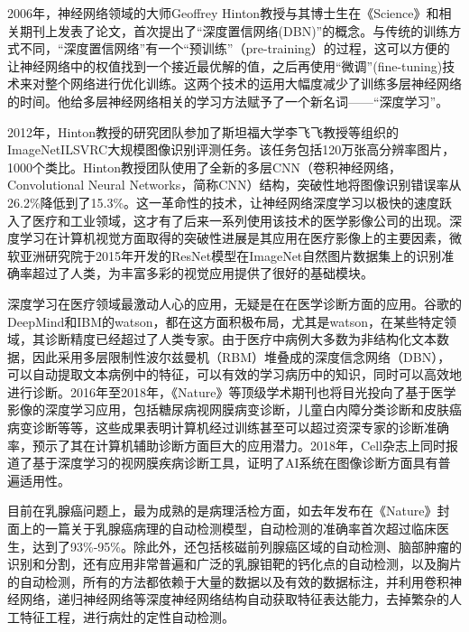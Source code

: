 2006年，神经网络领域的大师Geoffrey Hinton教授与其博士生在《Science》和相关期刊上发表了论文，首次提出了“深度置信网络(DBN)\cite{6hinton2006fast}”的概念。与传统的训练方式不同，“深度置信网络”有一个“预训练”（pre-training）的过程，这可以方便的让神经网络中的权值找到一个接近最优解的值，之后再使用“微调”(fine-tuning)技术来对整个网络进行优化训练。这两个技术的运用大幅度减少了训练多层神经网络的时间。他给多层神经网络相关的学习方法赋予了一个新名词——“深度学习”。

2012年，Hinton教授的研究团队参加了斯坦福大学李飞飞教授等组织的ImageNetILSVRC大规模图像识别评测任务\cite{7krizhevsky2012imagenet}。该任务包括120万张高分辨率图片，1000个类比。Hinton教授团队使用了全新的多层CNN（卷积神经网络，Convolutional Neural Networks，简称CNN）结构，突破性地将图像识别错误率从26.2\%降低到了15.3\%。这一革命性的技术，让神经网络深度学习以极快的速度跃入了医疗和工业领域，这才有了后来一系列使用该技术的医学影像公司的出现。深度学习在计算机视觉方面取得的突破性进展是其应用在医疗影像上的主要因素，微软亚洲研究院于2015年开发的ResNet\cite{8he2016deep}模型在ImageNet自然图片数据集上的识别准确率超过了人类，为丰富多彩的视觉应用提供了很好的基础模块。

深度学习在医疗领域最激动人心的应用，无疑是在在医学诊断方面的应用。谷歌的DeepMind和IBM的watson，都在这方面积极布局，尤其是watson，在某些特定领域，其诊断精度已经超过了人类专家。由于医疗中病例大多数为非结构化文本数据，因此采用多层限制性波尔兹曼机（RBM）\cite{9nair2010rectified}堆叠成的深度信念网络（DBN），可以自动提取文本病例中的特征，可以有效的学习病历中的知识，同时可以高效地进行诊断。2016年至2018年，《Nature》等顶级学术期刊也将目光投向了基于医学影像的深度学习应用，包括糖尿病视网膜病变诊断\cite{10morris2017technology}，儿童白内障分类诊断\cite{11long2017artificial}和皮肤癌病变诊断\cite{12esteva2017dermatologist}等等，这些成果表明计算机经过训练甚至可以超过资深专家的诊断准确率，预示了其在计算机辅助诊断方面巨大的应用潜力。2018年，Cell杂志上同时报道了基于深度学习的视网膜疾病诊断工具\cite{13kermany2018identifying}，证明了AI系统在图像诊断方面具有普遍适用性。

目前在乳腺癌问题上，最为成熟的是病理活检方面，如去年发布在《Nature》封面上的一篇关于乳腺癌病理的自动检测模型\cite{14liu2017detecting}，自动检测的准确率首次超过临床医生，达到了93\%-95\%。除此外，还包括核磁前列腺癌区域的自动检测、脑部肿瘤的识别和分割，还有应用非常普遍和广泛的乳腺钼靶的钙化点的自动检测，以及胸片的自动检测，所有的方法都依赖于大量的数据以及有效的数据标注，并利用卷积神经网络，递归神经网络等深度神经网络结构自动获取特征表达能力，去掉繁杂的人工特征工程，进行病灶的定性自动检测。

